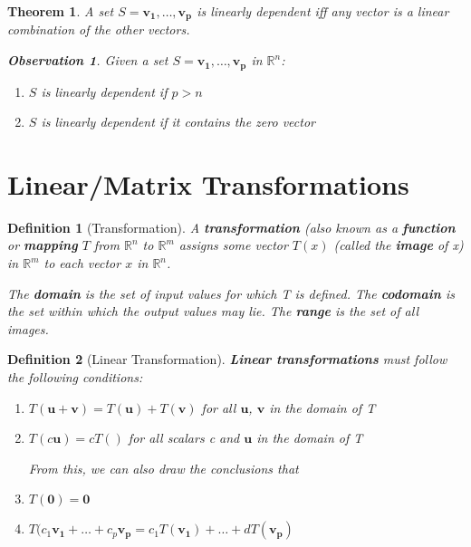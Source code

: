 \documentclass[12pt]{report}
\newtheorem{thm}{Theorem}
\newtheorem{dfn}{Definition}
\newtheorem{obs}{Observation}
\begin{document}
\begin{thm}

A set $S=\bm{v_1},\ldots,\bm{v_p}$ is linearly dependent iff any vector is a linear combination of the other vectors.

\begin{obs}
Given a set $S=\bm{v_1},\ldots,\bm{v_p}$ in $\mathbb{R}^n$:

\begin{enumerate}
\item $S$ is linearly dependent if $p>n$
\item $S$ is linearly dependent if it contains the zero vector
\end{enumerate}
\end{obs}

\end{thm}

\section{Linear/Matrix Transformations}

\begin{dfn}[Transformation]
A \textbf{transformation} (also known as a \textbf{function} or \textbf{mapping} $T$ from $\mathbb{R}^n$ to $\mathbb{R}^m$ assigns some vector $T(x)$ (called the \textbf{image} of x) in $\mathbb{R}^m$ to each vector $x$ in $\mathbb{R}^n$. 

The \textbf{domain} is the set of input values for which T is defined. The \textbf{codomain} is the set within which the output values may lie. The \textbf{range} is the set of all images.

\end{dfn}

\begin{dfn}[Linear Transformation]

\textbf{Linear transformations} must follow the following conditions:
\begin{enumerate}
\item $T(\bm{u}+\bm{v})=T(\bm{u})+T(\bm{v})$ for all $\bm{u}$, $\bm{v}$ in the domain of T
\item $T(c\bm{u})=cT(\bm{})$ for all scalars c and $\bm{u}$ in the domain of T

From this, we can also draw the conclusions that
\item $T(\bm{0})=\bm{0}$
\item $T(c_1\bm{v_1}+\ldots+c_p\bm{v_p}=c_1T(\bm{v_1})+\ldots+dT(\bm{v_p})$

\end{enumerate}

\end{dfn}
\end{document}
